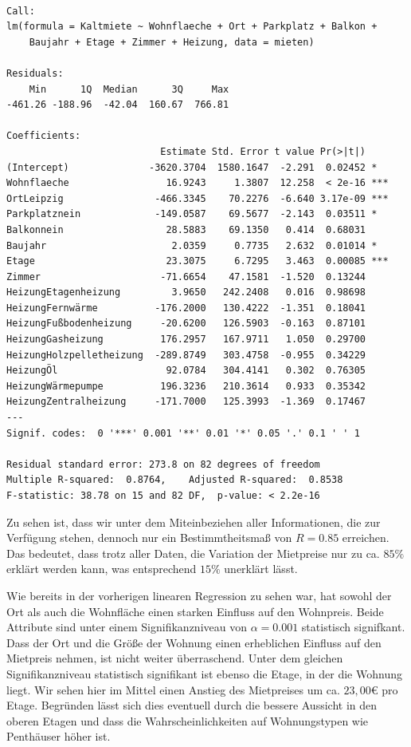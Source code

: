 \documentclass[
  a4paper,
  DIV=11]{scrartcl}
\begin{document}
\begin{verbatim}

Call:
lm(formula = Kaltmiete ~ Wohnflaeche + Ort + Parkplatz + Balkon + 
    Baujahr + Etage + Zimmer + Heizung, data = mieten)

Residuals:
    Min      1Q  Median      3Q     Max 
-461.26 -188.96  -42.04  160.67  766.81 

Coefficients:
                           Estimate Std. Error t value Pr(>|t|)    
(Intercept)              -3620.3704  1580.1647  -2.291  0.02452 *  
Wohnflaeche                 16.9243     1.3807  12.258  < 2e-16 ***
OrtLeipzig                -466.3345    70.2276  -6.640 3.17e-09 ***
Parkplatznein             -149.0587    69.5677  -2.143  0.03511 *  
Balkonnein                  28.5883    69.1350   0.414  0.68031    
Baujahr                      2.0359     0.7735   2.632  0.01014 *  
Etage                       23.3075     6.7295   3.463  0.00085 ***
Zimmer                     -71.6654    47.1581  -1.520  0.13244    
HeizungEtagenheizung         3.9650   242.2408   0.016  0.98698    
HeizungFernwärme          -176.2000   130.4222  -1.351  0.18041    
HeizungFußbodenheizung     -20.6200   126.5903  -0.163  0.87101    
HeizungGasheizung          176.2957   167.9711   1.050  0.29700    
HeizungHolzpelletheizung  -289.8749   303.4758  -0.955  0.34229    
HeizungÖl                   92.0784   304.4141   0.302  0.76305    
HeizungWärmepumpe          196.3236   210.3614   0.933  0.35342    
HeizungZentralheizung     -171.7000   125.3993  -1.369  0.17467    
---
Signif. codes:  0 '***' 0.001 '**' 0.01 '*' 0.05 '.' 0.1 ' ' 1

Residual standard error: 273.8 on 82 degrees of freedom
Multiple R-squared:  0.8764,    Adjusted R-squared:  0.8538 
F-statistic: 38.78 on 15 and 82 DF,  p-value: < 2.2e-16
\end{verbatim}

Zu sehen ist, dass wir unter dem Miteinbeziehen aller Informationen, die
zur Verfügung stehen, dennoch nur ein Bestimmtheitsmaß von \(R = 0.85\)
erreichen. Das bedeutet, dass trotz aller Daten, die Variation der
Mietpreise nur zu ca. \(85\%\) erklärt werden kann, was entsprechend
\(15\%\) unerklärt lässt.

Wie bereits in der vorherigen linearen Regression zu sehen war, hat
sowohl der Ort als auch die Wohnfläche einen starken Einfluss auf den
Wohnpreis. Beide Attribute sind unter einem Signifikanzniveau von
\(\alpha = 0.001\) statistisch signifkant. Dass der Ort und die Größe
der Wohnung einen erheblichen Einfluss auf den Mietpreis nehmen, ist
nicht weiter überraschend. Unter dem gleichen Signifikanzniveau
statistisch signifikant ist ebenso die Etage, in der die Wohnung liegt.
Wir sehen hier im Mittel einen Anstieg des Mietpreises um ca. \(23,00€\)
pro Etage. Begründen lässt sich dies eventuell durch die bessere
Aussicht in den oberen Etagen und dass die Wahrscheinlichkeiten auf
Wohnungstypen wie Penthäuser höher ist.
\end{document}
